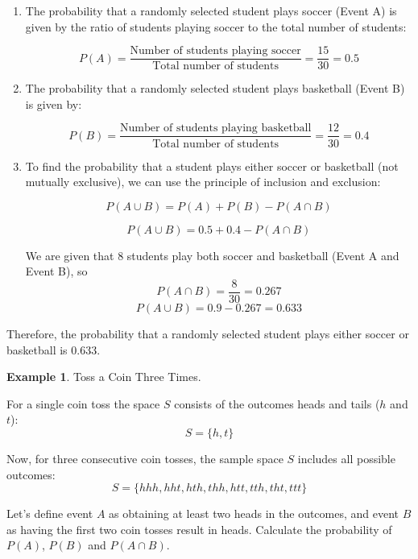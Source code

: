 \documentclass[12pt]{book}
\theoremstyle{definition}
\newtheorem{exmp}{Example}[chapter]
\begin{document}
\begin{enumerate}
    \item The probability that a randomly selected student plays soccer (Event A) is given by the ratio of students playing soccer to the total number of students:

   \[P(A) = \frac{\text{Number of students playing soccer}}{\text{Total number of students}} = \frac{15}{30} = 0.5\]

   \item The probability that a randomly selected student plays basketball (Event B) is given by:

   \[P(B) = \frac{\text{Number of students playing basketball}}{\text{Total number of students}} = \frac{12}{30} = 0.4\]

    \item To find the probability that a student plays either soccer or basketball (not mutually exclusive), we can use the principle of inclusion and exclusion:

   \[P(A \cup B) = P(A) + P(B) - P(A \cap B)\]

   \[P(A \cup B) = 0.5 + 0.4 - P(A \cap B) \]
   
   We are given that 8 students play both soccer and basketball (Event A and Event B), so 
   \[P(A \cap B) = \frac{8}{30} = 0.267\]
   \[P(A \cup B) = 0.9 - 0.267 = 0.633\]
   
\end{enumerate}

Therefore, the probability that a randomly selected student plays either soccer or basketball is 0.633.


\begin{tcolorbox}
\begin{exmp}{Toss a Coin Three Times.}  

For a single coin toss the space $S$ consists of the outcomes heads and tails ($h$ and $t$):
\[ S = \{h,t\} \]

Now, for three consecutive coin tosses, the sample space $S$ includes all possible outcomes:
\[ S = \{hhh, hht, hth, thh, htt, tth, tht, ttt\} \]

Let's define event \(A\) as obtaining at least two heads in the outcomes, and event \(B\) as having the first two coin tosses result in heads. Calculate the probability of \(P(A)\), \(P(B)\) and \(P(A \cap B)\).

\end{exmp}
\end{tcolorbox}
\end{document}
